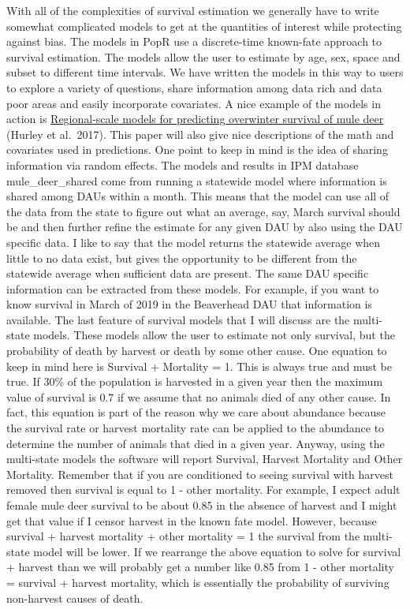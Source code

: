\documentclass[
]{book}
\begin{document}
With all of the complexities of survival estimation we generally have to write somewhat complicated models to get at the quantities of interest while protecting against bias. The models in PopR use a discrete-time known-fate approach to survival estimation. The models allow the user to estimate by age, sex, space and subset to different time intervals. We have written the models in this way to users to explore a variety of questions, share information among data rich and data poor areas and easily incorporate covariates. A nice example of the models in action is \href{https://wildlife.onlinelibrary.wiley.com/doi/full/10.1002/jwmg.21211}{Regional-scale models for predicting overwinter survival of mule deer} (Hurley et al.~2017). This paper will also give nice descriptions of the math and covariates used in predictions. One point to keep in mind is the idea of sharing information via random effects. The models and results in IPM database mule\_deer\_shared come from running a statewide model where information is shared among DAUs within a month. This means that the model can use all of the data from the state to figure out what an average, say, March survival should be and then further refine the estimate for any given DAU by also using the DAU specific data. I like to say that the model returns the statewide average when little to no data exist, but gives the opportunity to be different from the statewide average when sufficient data are present. The same DAU specific information can be extracted from these models. For example, if you want to know survival in March of 2019 in the Beaverhead DAU that information is available. The last feature of survival models that I will discuss are the multi-state models. These models allow the user to estimate not only survival, but the probability of death by harvest or death by some other cause. One equation to keep in mind here is Survival + Mortality = 1. This is always true and must be true. If 30\% of the population is harvested in a given year then the maximum value of survival is 0.7 if we assume that no animals died of any other cause. In fact, this equation is part of the reason why we care about abundance because the survival rate or harvest mortality rate can be applied to the abundance to determine the number of animals that died in a given year. Anyway, using the multi-state models the software will report Survival, Harvest Mortality and Other Mortality. Remember that if you are conditioned to seeing survival with harvest removed then survival is equal to 1 - other mortality. For example, I expect adult female mule deer survival to be about 0.85 in the absence of harvest and I might get that value if I censor harvest in the known fate model. However, because survival + harvest mortality + other mortality = 1 the survival from the multi-state model will be lower. If we rearrange the above equation to solve for survival + harvest than we will probably get a number like 0.85 from 1 - other mortality = survival + harvest mortality, which is essentially the probability of surviving non-harvest causes of death.
\end{document}
